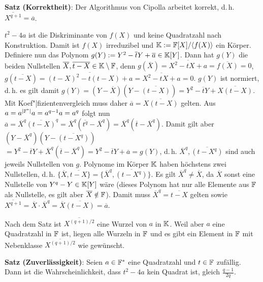 \linie

\textbf{Satz (Korrektheit)}:
Der Algorithmus von Cipolla arbeitet korrekt, d.\,h. $\overline{X^{q+1}} = \overline{a}$.

\begin{Beweis}
    $t^2 - 4a$ ist die Diskriminante von $f(X)$ und keine Quadratzahl nach Konstruktion.
    Damit ist $f(X)$ irreduzibel und $\mathbb{K} := \mathbb{F}[X]/\langle f(X)\rangle$ ein Körper.
    Definiere nun das Polynom $g(Y) := Y^2 - \overline{t} Y + \overline{a} \in \mathbb{K}[Y]$.
    Dann hat $g(Y)$ die beiden Nullstellen $\overline{X}, \overline{t - X} \in \mathbb{K} \setminus \mathbb{F}$,
    denn $g(\overline{X}) = \overline{X^2 - tX + a} = \overline{f(X)} = 0$,
    $g(\overline{t - X}) = \overline{(t - X)^2 - t(t - X) + a} = \overline{X^2 - tX + a} = 0$.
    $g(Y)$ ist normiert, d.\,h. es gilt damit
    $g(Y) = (Y - \overline{X}) (Y - \overline{(t - X)}) = Y^2 - \overline{t}Y + \overline{X(t-X)}$.
    Mit Koef"|fizientenvergleich muss daher $\overline{a} = \overline{X(t - X)}$ gelten.
    Aus $a = a^{|\mathbb{F}^\ast|} a = a^{q-1} a = a^q$ folgt nun
    $\overline{a} = \overline{X}^q \overline{(t - X)}^q
    = \overline{X}^q (\overline{t^q} - \overline{X}^q)
    = \overline{X}^q (\overline{t} - \overline{X}^q)$.
    Damit gilt aber $(Y - \overline{X}^q) (Y - \overline{(t - X^q)})$\\
    $= Y^2 - \overline{t}Y + \overline{X}^q (\overline{t} - \overline{X}^q)
    = Y^2 - \overline{t}Y + \overline{a} = g(Y)$, d.\,h. $\overline{X}^q, \overline{(t - X^q)}$
    sind auch jeweils Nullstellen von $g$.
    Polynome im Körper $\mathbb{K}$ haben höchstens zwei Nullstellen, d.\,h.
    $\{\overline{X}, \overline{t - X}\} = \{\overline{X}^q, \overline{(t - X^q)}\}$.
    Es gilt $\overline{X}^q \not= \overline{X}$, da $\overline{X}$ sonst eine Nullstelle
    von $Y^q - Y \in \mathbb{K}[Y]$ wäre (dieses Polynom hat nur alle Elemente aus $\mathbb{F}$ als Nullstelle,
    es gilt aber $\overline{X} \notin \mathbb{F}$).
    Damit muss $\overline{X}^q = \overline{t - X}$ gelten sowie
    $\overline{X^{q+1}} = \overline{X} \cdot \overline{X}^q
    = \overline{X} \overline{(t - X)} = \overline{a}$.
\end{Beweis}

Nach dem Satz ist $\overline{X^{(q+1)/2}}$ eine Wurzel von $a$ in $\mathbb{K}$.
Weil aber $a$ eine Quadratzahl in $\mathbb{F}$ ist, liegen alle Wurzeln in $\mathbb{F}$ und es gibt ein
Element in $\mathbb{F}$ mit Nebenklasse $\overline{X^{(q+1)/2}}$ wie gewünscht.

\linie

\textbf{Satz (Zuverlässigkeit)}:
Seien $a \in \mathbb{F}^\ast$ eine Quadratzahl und $t \in \mathbb{F}$ zufällig.\\
Dann ist die Wahrscheinlichkeit, dass $t^2 - 4a$ kein Quadrat ist, gleich $\frac{q-1}{2q}$.

